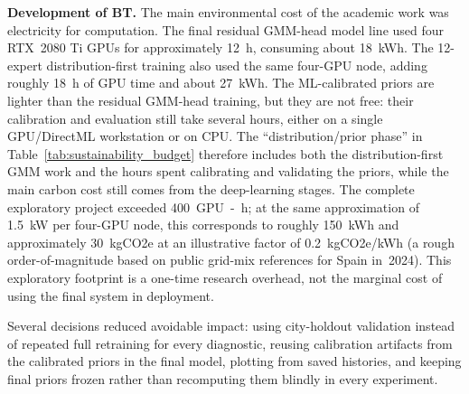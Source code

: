 \textbf{Development of BT.} The main environmental cost of the academic
work was electricity for computation. The final residual GMM-head model line used four RTX~2080
Ti GPUs for approximately \SI{12}{h}, consuming about \SI{18}{kWh}.
The 12-expert distribution-first training also used the
same four-GPU node, adding roughly \SI{18}{h} of GPU time and about
\SI{27}{kWh}. The ML-calibrated priors are lighter than the residual GMM-head
training, but they are not free: their calibration and evaluation still take
several hours, either on a single GPU/DirectML workstation or on CPU. The
``distribution/prior phase'' in Table~\ref{tab:sustainability_budget} therefore
includes both the distribution-first GMM work and the hours spent calibrating
and validating the priors, while the main carbon cost still comes from the
deep-learning stages. The complete exploratory project exceeded
\SI{400}{GPU-h}; at the same approximation of \SI{1.5}{kW} per four-GPU node,
this corresponds to roughly \SI{150}{kWh} and approximately
\SI{30}{kgCO2e} at an illustrative factor of 0.2~kgCO2e/kWh (a rough
order-of-magnitude based on public grid-mix references for Spain in~2024).
This exploratory footprint is a one-time research overhead, not the marginal
cost of using the final system in deployment.

Several decisions reduced avoidable impact: using city-holdout validation
instead of repeated full retraining for every diagnostic, reusing calibration
artifacts from the calibrated priors in the final model, plotting from saved histories, and
keeping final priors frozen rather than recomputing them blindly in every
experiment.

